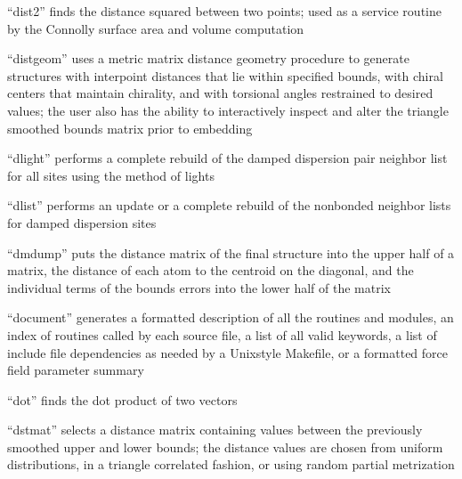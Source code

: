 \documentclass[letterpaper,11pt,english]{sphinxmanual}
\begin{document}
\sphinxAtStartPar
{}

\sphinxAtStartPar
“dist2” finds the distance squared between two points; used as a service routine by the Connolly surface area and volume computation

\sphinxAtStartPar
{}

\sphinxAtStartPar
“distgeom” uses a metric matrix distance geometry procedure to generate structures with interpoint distances that lie within specified bounds, with chiral centers that maintain chirality, and with torsional angles restrained to desired values; the user also has the ability to interactively inspect and alter the triangle smoothed bounds matrix prior to embedding

\sphinxAtStartPar
{}

\sphinxAtStartPar
“dlight” performs a complete rebuild of the damped dispersion pair neighbor list for all sites using the method of lights

\sphinxAtStartPar
{}

\sphinxAtStartPar
“dlist” performs an update or a complete rebuild of the nonbonded neighbor lists for damped dispersion sites

\sphinxAtStartPar
{}

\sphinxAtStartPar
“dmdump” puts the distance matrix of the final structure into the upper half of a matrix, the distance of each atom to the centroid on the diagonal, and the individual terms of the bounds errors into the lower half of the matrix

\sphinxAtStartPar
{}

\sphinxAtStartPar
“document” generates a formatted description of all the routines and modules, an index of routines called by each source file, a list of all valid keywords, a list of include file dependencies as needed by a Unix\sphinxhyphen{}style Makefile, or a formatted force field parameter summary

\sphinxAtStartPar
{}

\sphinxAtStartPar
“dot” finds the dot product of two vectors

\sphinxAtStartPar
{}

\sphinxAtStartPar
“dstmat” selects a distance matrix containing values between the previously smoothed upper and lower bounds; the distance values are chosen from uniform distributions, in a triangle correlated fashion, or using random partial metrization
\end{document}
